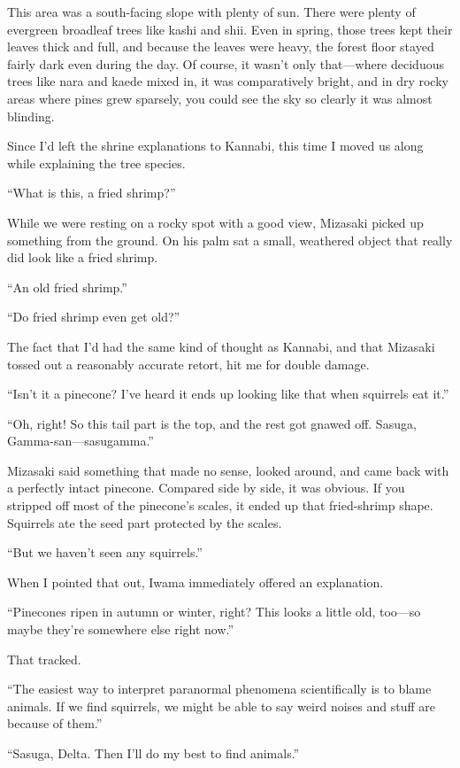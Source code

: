 \documentclass[
    a4paper,
    12pt,
    twoside,
    openany,
    UTF8,
    fontset=windows
]{ctexbook}
\begin{document}
This area was a south-facing slope with plenty of sun. There were plenty of evergreen broadleaf trees like kashi and shii. Even in spring, those trees kept their leaves thick and full, and because the leaves were heavy, the forest floor stayed fairly dark even during the day. Of course, it wasn't only that---where deciduous trees like nara and kaede mixed in, it was comparatively bright, and in dry rocky areas where pines grew sparsely, you could see the sky so clearly it was almost blinding.

Since I'd left the shrine explanations to Kannabi, this time I moved us along while explaining the tree species.

``What is this, a fried shrimp?''

While we were resting on a rocky spot with a good view, Mizasaki picked up something from the ground. On his palm sat a small, weathered object that really did look like a fried shrimp.

``An old fried shrimp.''

``Do fried shrimp even get old?''

The fact that I'd had the same kind of thought as Kannabi, and that Mizasaki tossed out a reasonably accurate retort, hit me for double damage.

``Isn't it a pinecone? I've heard it ends up looking like that when squirrels eat it.''

``Oh, right! So this tail part is the top, and the rest got gnawed off. Sasuga, Gamma-san---sasugamma.''

Mizasaki said something that made no sense, looked around, and came back with a perfectly intact pinecone. Compared side by side, it was obvious. If you stripped off most of the pinecone's scales, it ended up that fried-shrimp shape. Squirrels ate the seed part protected by the scales.

``But we haven't seen any squirrels.''

When I pointed that out, Iwama immediately offered an explanation.

``Pinecones ripen in autumn or winter, right? This looks a little old, too---so maybe they're somewhere else right now.''

That tracked.

``The easiest way to interpret paranormal phenomena scientifically is to blame animals. If we find squirrels, we might be able to say weird noises and stuff are because of them.''

``Sasuga, Delta. Then I'll do my best to find animals.''
\end{document}

